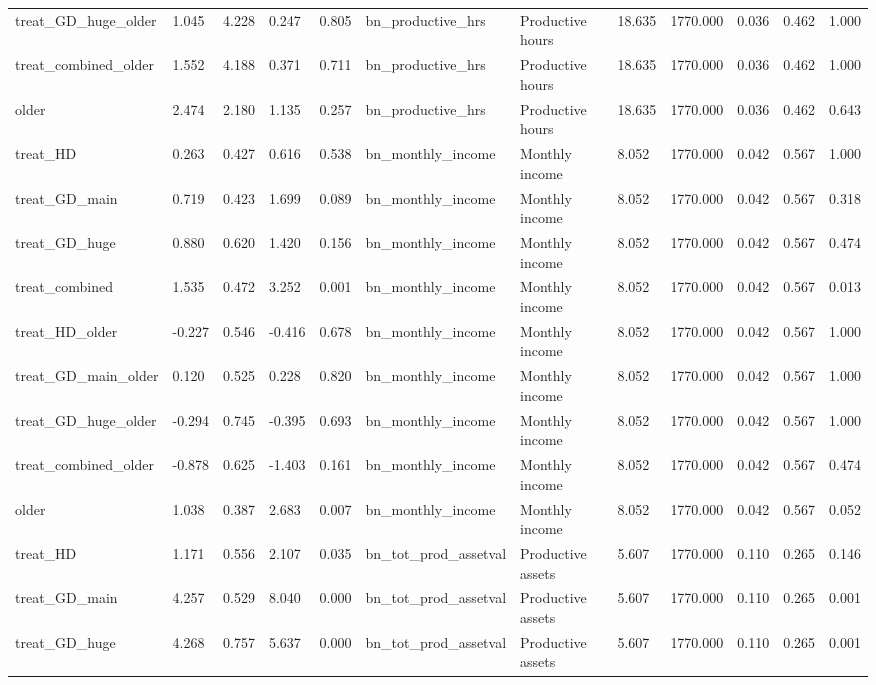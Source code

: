 \begin{tabular}{llllllllllll}
treat\_GD\_huge\_older & 1.045 & 4.228 & 0.247 & 0.805 & bn\_productive\_hrs & Productive hours & 18.635 & 1770.000 & 0.036 & 0.462 & 1.000 \\
treat\_combined\_older & 1.552 & 4.188 & 0.371 & 0.711 & bn\_productive\_hrs & Productive hours & 18.635 & 1770.000 & 0.036 & 0.462 & 1.000 \\
older & 2.474 & 2.180 & 1.135 & 0.257 & bn\_productive\_hrs & Productive hours & 18.635 & 1770.000 & 0.036 & 0.462 & 0.643 \\
treat\_HD & 0.263 & 0.427 & 0.616 & 0.538 & bn\_monthly\_income & Monthly income & 8.052 & 1770.000 & 0.042 & 0.567 & 1.000 \\
treat\_GD\_main & 0.719 & 0.423 & 1.699 & 0.089 & bn\_monthly\_income & Monthly income & 8.052 & 1770.000 & 0.042 & 0.567 & 0.318 \\
treat\_GD\_huge & 0.880 & 0.620 & 1.420 & 0.156 & bn\_monthly\_income & Monthly income & 8.052 & 1770.000 & 0.042 & 0.567 & 0.474 \\
treat\_combined & 1.535 & 0.472 & 3.252 & 0.001 & bn\_monthly\_income & Monthly income & 8.052 & 1770.000 & 0.042 & 0.567 & 0.013 \\
treat\_HD\_older & -0.227 & 0.546 & -0.416 & 0.678 & bn\_monthly\_income & Monthly income & 8.052 & 1770.000 & 0.042 & 0.567 & 1.000 \\
treat\_GD\_main\_older & 0.120 & 0.525 & 0.228 & 0.820 & bn\_monthly\_income & Monthly income & 8.052 & 1770.000 & 0.042 & 0.567 & 1.000 \\
treat\_GD\_huge\_older & -0.294 & 0.745 & -0.395 & 0.693 & bn\_monthly\_income & Monthly income & 8.052 & 1770.000 & 0.042 & 0.567 & 1.000 \\
treat\_combined\_older & -0.878 & 0.625 & -1.403 & 0.161 & bn\_monthly\_income & Monthly income & 8.052 & 1770.000 & 0.042 & 0.567 & 0.474 \\
older & 1.038 & 0.387 & 2.683 & 0.007 & bn\_monthly\_income & Monthly income & 8.052 & 1770.000 & 0.042 & 0.567 & 0.052 \\
treat\_HD & 1.171 & 0.556 & 2.107 & 0.035 & bn\_tot\_prod\_assetval & Productive assets & 5.607 & 1770.000 & 0.110 & 0.265 & 0.146 \\
treat\_GD\_main & 4.257 & 0.529 & 8.040 & 0.000 & bn\_tot\_prod\_assetval & Productive assets & 5.607 & 1770.000 & 0.110 & 0.265 & 0.001 \\
treat\_GD\_huge & 4.268 & 0.757 & 5.637 & 0.000 & bn\_tot\_prod\_assetval & Productive assets & 5.607 & 1770.000 & 0.110 & 0.265 & 0.001 \\

\end{tabular}
